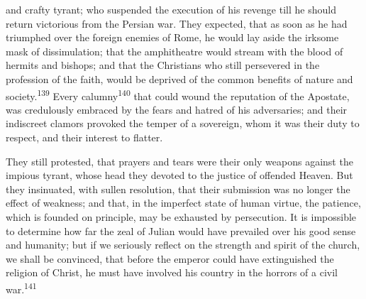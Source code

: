 and crafty tyrant; who suspended the execution of his revenge
till he should return victorious from the Persian war. They
expected, that as soon as he had triumphed over the foreign
enemies of Rome, he would lay aside the irksome mask of
dissimulation; that the amphitheatre would stream with the blood
of hermits and bishops; and that the Christians who still
persevered in the profession of the faith, would be deprived of
the common benefits of nature and society.\textsuperscript{139} Every calumny\textsuperscript{140}
that could wound the reputation of the Apostate, was credulously
embraced by the fears and hatred of his adversaries; and their
indiscreet clamors provoked the temper of a sovereign, whom it
was their duty to respect, and their interest to flatter.

They still protested, that prayers and tears were their only
weapons against the impious tyrant, whose head they devoted to
the justice of offended Heaven. But they insinuated, with sullen
resolution, that their submission was no longer the effect of
weakness; and that, in the imperfect state of human virtue, the
patience, which is founded on principle, may be exhausted by
persecution. It is impossible to determine how far the zeal of
Julian would have prevailed over his good sense and humanity; but
if we seriously reflect on the strength and spirit of the church,
we shall be convinced, that before the emperor could have
extinguished the religion of Christ, he must have involved his
country in the horrors of a civil war.\textsuperscript{141}






